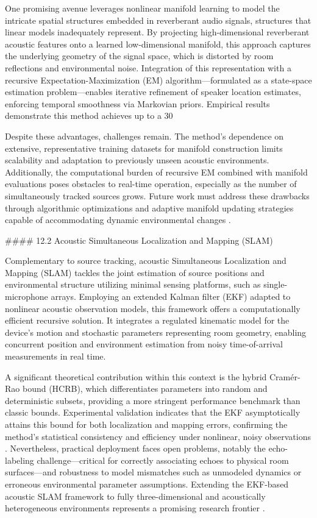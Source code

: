 \documentclass[11pt]{article}
\begin{document}
One promising avenue leverages nonlinear manifold learning to model the intricate spatial structures embedded in reverberant audio signals, structures that linear models inadequately represent. By projecting high-dimensional reverberant acoustic features onto a learned low-dimensional manifold, this approach captures the underlying geometry of the signal space, which is distorted by room reflections and environmental noise. Integration of this representation with a recursive Expectation-Maximization (EM) algorithm—formulated as a state-space estimation problem—enables iterative refinement of speaker location estimates, enforcing temporal smoothness via Markovian priors. Empirical results demonstrate this method achieves up to a 30%

Despite these advantages, challenges remain. The method's dependence on extensive, representative training datasets for manifold construction limits scalability and adaptation to previously unseen acoustic environments. Additionally, the computational burden of recursive EM combined with manifold evaluations poses obstacles to real-time operation, especially as the number of simultaneously tracked sources grows. Future work must address these drawbacks through algorithmic optimizations and adaptive manifold updating strategies capable of accommodating dynamic environmental changes \cite{ref38}.

#### 12.2 Acoustic Simultaneous Localization and Mapping (SLAM)

Complementary to source tracking, acoustic Simultaneous Localization and Mapping (SLAM) tackles the joint estimation of source positions and environmental structure utilizing minimal sensing platforms, such as single-microphone arrays. Employing an extended Kalman filter (EKF) adapted to nonlinear acoustic observation models, this framework offers a computationally efficient recursive solution. It integrates a regulated kinematic model for the device's motion and stochastic parameters representing room geometry, enabling concurrent position and environment estimation from noisy time-of-arrival measurements in real time.

A significant theoretical contribution within this context is the hybrid Cramér-Rao bound (HCRB), which differentiates parameters into random and deterministic subsets, providing a more stringent performance benchmark than classic bounds. Experimental validation indicates that the EKF asymptotically attains this bound for both localization and mapping errors, confirming the method’s statistical consistency and efficiency under nonlinear, noisy observations \cite{ref39}. Nevertheless, practical deployment faces open problems, notably the echo-labeling challenge—critical for correctly associating echoes to physical room surfaces—and robustness to model mismatches such as unmodeled dynamics or erroneous environmental parameter assumptions. Extending the EKF-based acoustic SLAM framework to fully three-dimensional and acoustically heterogeneous environments represents a promising research frontier \cite{ref39}.
\end{document}
